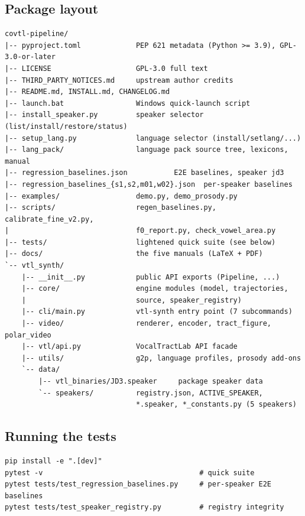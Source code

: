 \documentclass[11pt,a4paper]{article}
\begin{document}
\subsection{Package layout}

\begin{lstlisting}[style=verbatim]
covtl-pipeline/
|-- pyproject.toml             PEP 621 metadata (Python >= 3.9), GPL-3.0-or-later
|-- LICENSE                    GPL-3.0 full text
|-- THIRD_PARTY_NOTICES.md     upstream author credits
|-- README.md, INSTALL.md, CHANGELOG.md
|-- launch.bat                 Windows quick-launch script
|-- install_speaker.py         speaker selector (list/install/restore/status)
|-- setup_lang.py              language selector (install/setlang/...)
|-- lang_pack/                 language pack source tree, lexicons, manual
|-- regression_baselines.json           E2E baselines, speaker jd3
|-- regression_baselines_{s1,s2,m01,w02}.json  per-speaker baselines
|-- examples/                  demo.py, demo_prosody.py
|-- scripts/                   regen_baselines.py, calibrate_fine_v2.py,
|                              f0_report.py, check_vowel_area.py
|-- tests/                     lightened quick suite (see below)
|-- docs/                      the five manuals (LaTeX + PDF)
`-- vtl_synth/
    |-- __init__.py            public API exports (Pipeline, ...)
    |-- core/                  engine modules (model, trajectories,
    |                          source, speaker_registry)
    |-- cli/main.py            vtl-synth entry point (7 subcommands)
    |-- video/                 renderer, encoder, tract_figure, polar_video
    |-- vtl/api.py             VocalTractLab API facade
    |-- utils/                 g2p, language profiles, prosody add-ons
    `-- data/
        |-- vtl_binaries/JD3.speaker     package speaker data
        `-- speakers/          registry.json, ACTIVE_SPEAKER,
                               *.speaker, *_constants.py (5 speakers)
\end{lstlisting}

\subsection{Running the tests}

\begin{lstlisting}[style=shell]
pip install -e ".[dev]"
pytest -v                                     # quick suite
pytest tests/test_regression_baselines.py     # per-speaker E2E baselines
pytest tests/test_speaker_registry.py         # registry integrity
\end{lstlisting}
\end{document}
